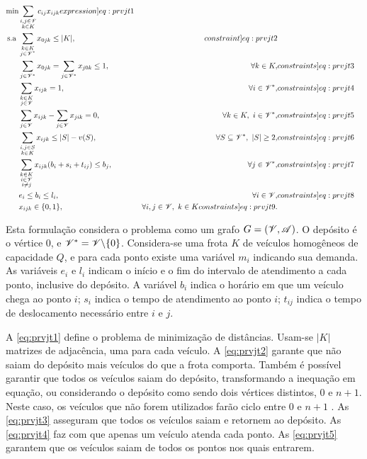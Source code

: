 \begin{align}
    \min&\sum_{\substack{i,j\in \mcal{V}\\ k\in K}}c_{ij}x_{ijk} \label[expression]{eq:prvjt1}\\
    \text{s.a }&\sum_{\substack{k \in K \\ j \in \mcal{V}\fast}} x_{0jk} \leq |K|,& \label[constraint]{eq:prvjt2}\\
    &\sum_{j\in \mcal{V}\fast}x_{0jk} = \sum_{j\in \mcal{V}\fast}x_{j0k} \leq 1,&\forall k \in K,& \label[constraints]{eq:prvjt3}\\
    &\sum_{\substack{k\in K \\ j\in \mcal{V}}}x_{ijk} = 1,&\forall i \in \mcal{V}\fast,& \label[constraints]{eq:prvjt4}\\
    &\sum_{j\in \mcal{V}}x_{ijk} - \sum_{j \in \mcal{V}}x_{jik} = 0,&\forall k \in K,\ i \in \mcal{V}\fast,& \label[constraints]{eq:prvjt5}\\
    &\sum_{\substack{i,j\in S \\ k \in K}}x_{ijk} \leq |S| - v(S),&\forall S \subseteq \mcal{V}\fast,\ |S| \geq 2,& \label[constraints]{eq:prvjt6}\\
    &\sum_{\substack{k \in K \\ i \in \mcal{V} \\ i \neq j}}x_{ijk}(b_i + s_i + t_{ij}) \leq b_j,&\forall j \in \mcal{V}\fast,& \label[constraints]{eq:prvjt7}\\
    &e_i \leq b_i \leq l_i,&\forall i \in \mcal{V},& \label[constraints]{eq:prvjt8}\\
    &x_{ijk} \in \{0,1\},&\forall i, j \in \mcal{V},\ k \in K \label[constraints]{eq:prvjt9}.
\end{align}

Esta formulação considera o problema como um grafo $G = (\mathcal{V}, \mathcal{A})$. O depósito é o vértice $0$, e $\mathcal{V}^\ast = \mathcal{V} \backslash \{0\}$. Considera-se uma frota $K$ de veículos homogêneos de capacidade $Q$, e para cada ponto existe uma variável $m_i$ indicando sua demanda. As variáveis $e_i$ e $l_i$ indicam o início e o fim do intervalo de atendimento a cada ponto, inclusive do depósito. A variável $b_i$ indica o horário em que um veículo chega ao ponto $i$; $s_i$ indica o tempo de atendimento ao ponto $i$; $t_{ij}$ indica o tempo de deslocamento necessário entre $i$ e $j$.

A \cref{eq:prvjt1} define o problema de minimização de distâncias. Usam-se $|K|$ matrizes de adjacência, uma para cada veículo. A \cref{eq:prvjt2} garante que não saiam do depósito mais veículos do que a frota comporta. Também é possível garantir que todos os veículos saiam do depósito, transformando a inequação em equação, ou considerando o depósito como sendo dois vértices distintos, $0$ e $n + 1$. Neste caso, os veículos que não forem utilizados farão ciclo entre $0$ e $n + 1$ \cite{SHERBENY:10}. As \cref{eq:prvjt3} asseguram que todos os veículos saiam e retornem ao depósito. As \cref{eq:prvjt4} faz com que apenas um veículo atenda cada ponto. As \cref{eq:prvjt5} garantem que os veículos saiam de todos os pontos nos quais entrarem.

